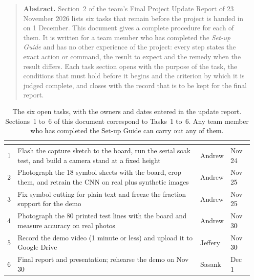 \begin{quote}
\small
\textbf{Abstract.} Section~2 of the team's Final Project Update Report of 23 November 2026 lists
six tasks that remain before the project is handed in on 1 December. This document gives a
complete procedure for each of them. It is written for a team member who has completed the
\emph{Set-up Guide} and has no other experience of the project: every step states the exact
action or command, the result to expect and the remedy when the result differs. Each task
section opens with the purpose of the task, the conditions that must hold before it begins and
the criterion by which it is judged complete, and closes with the record that is to be kept for
the final report.
\end{quote}

\begin{table}[H]
\centering\small
\begin{tabular}{C{0.9cm}L{7.1cm}C{1.4cm}C{1.3cm}}
\toprule
{} &  &  &  \\
 & Flash the capture sketch to the board, run the serial soak test, and build a camera stand at
    a fixed height & Andrew & Nov 24 \\
2 & Photograph the 18 symbol sheets with the board, crop them, and retrain the CNN on real plus
    synthetic images & Andrew & Nov 25 \\
3 & Fix symbol cutting for plain text and freeze the fraction support for the demo & Andrew &
    Nov 25 \\
4 & Photograph the 80 printed test lines with the board and measure accuracy on real photos &
    Andrew & Nov 30 \\
5 & Record the demo video (1 minute or less) and upload it to Google Drive & Jeffery & Nov 30 \\
6 & Final report and presentation; rehearse the demo on Nov 30 & Sasank & Dec 1 \\
\bottomrule
\end{tabular}
\caption{The six open tasks, with the owners and dates entered in the update report. Sections~1
to~6 of this document correspond to Tasks~1 to~6. Any team member who has completed the Set-up
Guide can carry out any of them.}
\label{tab:tasks}
\end{table}
